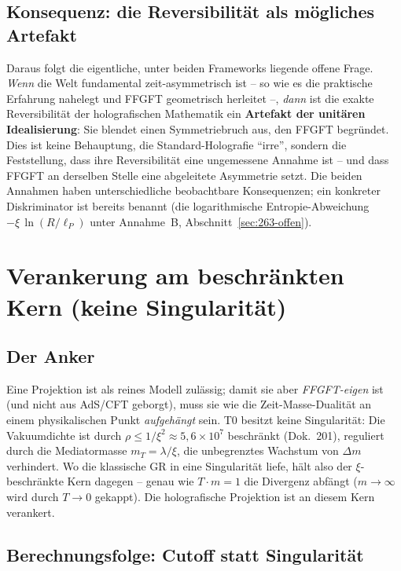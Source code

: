 \subsection*{Konsequenz: die Reversibilität als mögliches Artefakt}

Daraus folgt die eigentliche, unter beiden Frameworks liegende offene Frage.
\emph{Wenn} die Welt fundamental zeit-asymmetrisch ist -- so wie es die
praktische Erfahrung nahelegt und FFGFT geometrisch herleitet --, \emph{dann}
ist die exakte Reversibilität der holografischen Mathematik ein
\textbf{Artefakt der unitären Idealisierung}: Sie blendet einen Symmetriebruch
aus, den FFGFT begründet. Dies ist keine Behauptung, die Standard-Holografie
\enquote{irre}, sondern die Feststellung, dass ihre Reversibilität eine
ungemessene Annahme ist -- und dass FFGFT an derselben Stelle eine abgeleitete
Asymmetrie setzt. Die beiden Annahmen haben unterschiedliche beobachtbare
Konsequenzen; ein konkreter Diskriminator ist bereits benannt (die
logarithmische Entropie-Abweichung $-\xi\,\ln(R/\ell_P)$ unter Annahme~B,
Abschnitt~\ref{sec:263-offen}).

\section{Verankerung am beschränkten Kern (keine Singularität)}

\subsection*{Der Anker}

Eine Projektion ist als reines Modell zulässig; damit sie aber
\emph{FFGFT-eigen} ist (und nicht aus AdS/CFT geborgt), muss sie wie die
Zeit-Masse-Dualität an einem physikalischen Punkt \emph{aufgehängt} sein. T0
besitzt keine Singularität: Die Vakuumdichte ist durch
$\rho \le 1/\xi^2 \approx 5{,}6\times10^{7}$ beschränkt (Dok.~201), reguliert
durch die Mediatormasse $m_T = \lambda/\xi$, die unbegrenztes Wachstum von
$\Delta m$ verhindert. Wo die klassische GR in eine Singularität liefe, hält
also der $\xi$-beschränkte Kern dagegen -- genau wie $T\cdot m=1$ die
Divergenz abfängt ($m\to\infty$ wird durch $T\to 0$ gekappt). Die
holografische Projektion ist an diesem Kern verankert.

\subsection*{Berechnungsfolge: Cutoff statt Singularität}

